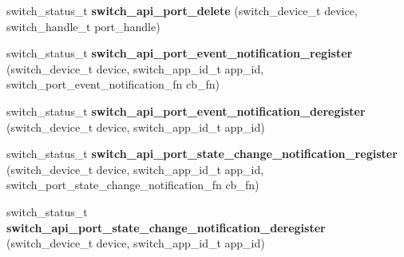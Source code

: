 \begin{DoxyCompactItemize}
\item 
\hypertarget{group__Port_ga684b3171a5bfc6167f81e192cac5e4f6}{switch\+\_\+status\+\_\+t {\bfseries switch\+\_\+api\+\_\+port\+\_\+delete} (switch\+\_\+device\+\_\+t device, switch\+\_\+handle\+\_\+t port\+\_\+handle)}\label{group__Port_ga684b3171a5bfc6167f81e192cac5e4f6}

\item 
\hypertarget{group__Port_gae1e3edc8ef18481bfa2a6beca5da110a}{switch\+\_\+status\+\_\+t {\bfseries switch\+\_\+api\+\_\+port\+\_\+event\+\_\+notification\+\_\+register} (switch\+\_\+device\+\_\+t device, switch\+\_\+app\+\_\+id\+\_\+t app\+\_\+id, switch\+\_\+port\+\_\+event\+\_\+notification\+\_\+fn cb\+\_\+fn)}\label{group__Port_gae1e3edc8ef18481bfa2a6beca5da110a}

\item 
\hypertarget{group__Port_gafbed44eb4a2f259de693074943f3248d}{switch\+\_\+status\+\_\+t {\bfseries switch\+\_\+api\+\_\+port\+\_\+event\+\_\+notification\+\_\+deregister} (switch\+\_\+device\+\_\+t device, switch\+\_\+app\+\_\+id\+\_\+t app\+\_\+id)}\label{group__Port_gafbed44eb4a2f259de693074943f3248d}

\item 
\hypertarget{group__Port_ga84e3a3bf8aa70ece4db43ce04737ddae}{switch\+\_\+status\+\_\+t {\bfseries switch\+\_\+api\+\_\+port\+\_\+state\+\_\+change\+\_\+notification\+\_\+register} (switch\+\_\+device\+\_\+t device, switch\+\_\+app\+\_\+id\+\_\+t app\+\_\+id, switch\+\_\+port\+\_\+state\+\_\+change\+\_\+notification\+\_\+fn cb\+\_\+fn)}\label{group__Port_ga84e3a3bf8aa70ece4db43ce04737ddae}

\item 
\hypertarget{group__Port_gae6a3f5879951cd11e7473831cd8d28c3}{switch\+\_\+status\+\_\+t {\bfseries switch\+\_\+api\+\_\+port\+\_\+state\+\_\+change\+\_\+notification\+\_\+deregister} (switch\+\_\+device\+\_\+t device, switch\+\_\+app\+\_\+id\+\_\+t app\+\_\+id)}\label{group__Port_gae6a3f5879951cd11e7473831cd8d28c3}


\end{DoxyCompactItemize}
